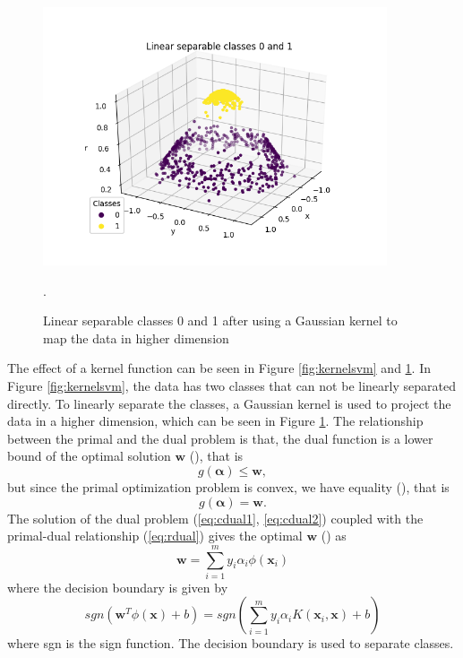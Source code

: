 \documentclass[../Main/thesis.tex]{subfiles}
\begin{document}
\begin{figure}[H] %
   \centering
   \includegraphics[width=4in]{../fig/linearseparable.png} 
   \caption{Linear separable classes 0 and 1 after using a Gaussian kernel to map the data in higher dimension}.
   \label{fig:kernelsvm1}
\end{figure}
\justify
The effect of a kernel function can be seen in Figure \ref{fig:kernelsvm} and \ref{fig:kernelsvm1}. In Figure \ref{fig:kernelsvm}, the data has two classes that can not be linearly separated directly. To linearly separate the classes, a Gaussian kernel is used to project the data in a higher dimension, which can be seen in Figure \ref{fig:kernelsvm1}.
\justify
The relationship between the primal and the dual problem is that, the dual function is a lower bound of the optimal solution $\bm{w}$ (\cite{boyd2004}), that is 
\begin{equation}
	g(\bm{\alpha}) \leq \bm{w},
\end{equation}
but since the primal optimization problem is convex, we have equality (\cite{boyd2004}), that is 
\begin{equation}\label{eq:rdual}
g(\bm{\alpha}) = \bm{w}.
\end{equation}
The solution of the dual problem (\ref{eq:cdual1}, \ref{eq:cdual2}) coupled with the primal-dual relationship (\ref{eq:rdual}) gives the optimal $\bm{w}$ (\cite{chang2001}) as
\begin{equation}
	\bm{w} = \sum_{i = 1}^{m}y_{i}\alpha_{i}\phi(\bm{x}_{i})
\end{equation}
where the decision boundary is given by
\begin{equation}
	sgn\left(\bm{w}^{T}\phi(\bm{x}) + b  \right) = sgn\left(  \sum_{i=1}^{m}y_{i}\alpha_{i}K(\bm{x}_{i},\bm{x} ) +b    \right)
\end{equation}
where sgn is the sign function. The decision boundary is used to separate classes.
\end{document}
